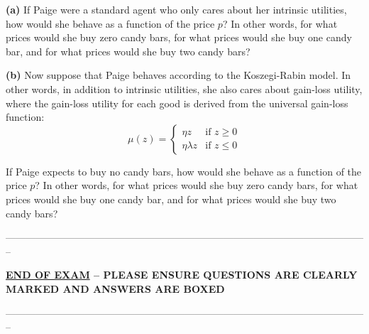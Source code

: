 \documentclass[12pt]{article}
\theoremstyle{definition}
\begin{document}
\textbf{(a)} If Paige were a standard agent who only cares about her
intrinsic utilities, how would she behave as a function of the price $p$? In
other words, for what prices would she buy zero candy bars, for what prices
would she buy one candy bar, and for what prices would she buy two candy
bars?

\textbf{(b)} Now suppose that Paige behaves according to the Koszegi-Rabin
model. In other words, in addition to intrinsic utilities, she also cares
about gain-loss utility, where the gain-loss utility for each good is
derived from the universal gain-loss function:%
\[
\mu (z)=\left\{ 
\begin{array}{cc}
\eta z & \text{if }z\geq 0 \\ 
\eta \lambda z & \text{if }z\leq 0%
\end{array}%
\right. 
\]

If Paige expects to buy no candy bars, how would she behave as a function of the price $p$? In other words, for what prices would she buy zero candy bars, for what prices would she buy one candy bar, and for what prices would she buy two candy bars?

\begin{center}
--------------------------------------------------------------------------------------------------------------

\textbf{\underline{END OF EXAM} -- PLEASE ENSURE QUESTIONS ARE CLEARLY MARKED AND ANSWERS ARE BOXED}

--------------------------------------------------------------------------------------------------------------%

\end{center}
\end{document}
